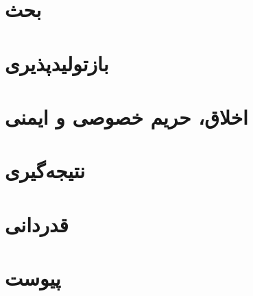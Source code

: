 \documentclass[11pt]{article}
\begin{document}
\section{بحث}


\section{بازتولیدپذیری}


\section{اخلاق، حریم خصوصی و ایمنی}


\section{نتیجه‌گیری}


\section*{قدردانی}


\appendix
\section{پیوست}




\end{document}
